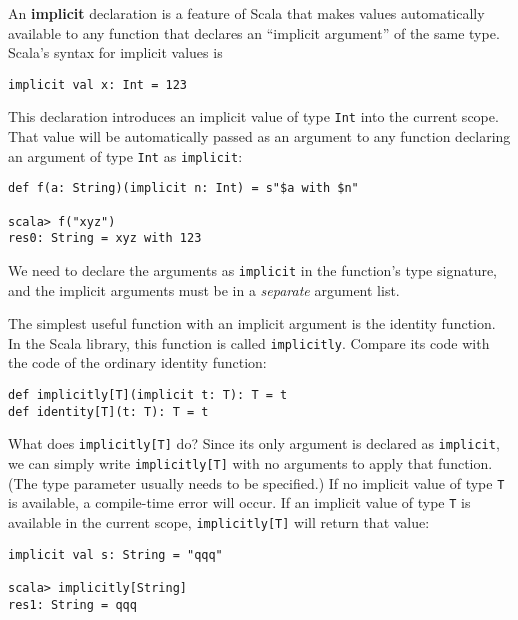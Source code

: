 An \textbf{implicit } declaration is a feature
of Scala that makes values automatically available to any function
that declares an \textsf{``}implicit argument\textsf{''} of the same type. Scala\textsf{'}s
syntax for implicit values is
\begin{lstlisting}
implicit val x: Int = 123
\end{lstlisting}
This declaration introduces an implicit value of type \lstinline!Int!
into the current scope. That value will be automatically passed as
an argument to any function declaring an argument of type \lstinline!Int!
as \lstinline!implicit!:
\begin{lstlisting}
def f(a: String)(implicit n: Int) = s"$a with $n"

scala> f("xyz")
res0: String = xyz with 123
\end{lstlisting}
We need to declare the arguments as \lstinline!implicit! in the function\textsf{'}s
type signature, and the implicit arguments must be in a \emph{separate}
argument list.

The simplest useful function with an implicit argument is the identity
function. In the Scala library, this function is called \lstinline!implicitly!.
Compare its code with the code of the ordinary identity function:
\begin{lstlisting}
def implicitly[T](implicit t: T): T = t
def identity[T](t: T): T = t
\end{lstlisting}
What does \lstinline!implicitly[T]! do? Since its only argument is
declared as \lstinline!implicit!, we can simply write \lstinline!implicitly[T]!
with no arguments to apply that function. (The type parameter usually
needs to be specified.) If no implicit value of type \lstinline!T!
is available, a compile-time error will occur. If an implicit value
of type \lstinline!T! is available in the current scope, \lstinline!implicitly[T]!
will return that value:
\begin{lstlisting}
implicit val s: String = "qqq"

scala> implicitly[String]
res1: String = qqq
\end{lstlisting}

